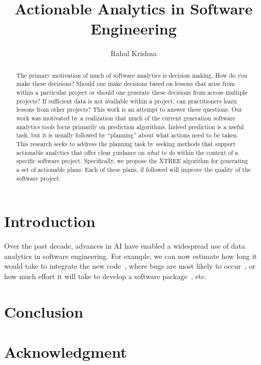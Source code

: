 \documentclass[conference]{IEEEtran}
\begin{document}
\title{Actionable Analytics in Software Engineering\\[-0.2cm]}
\author{Rahul Krishna\\
}

\maketitle


\begin{abstract}

The primary motivation of much of software analytics is decision making. How do you make these decisions? Should one make decisions based on lessons that arise from within a particular project or should one generate these decisions from across multiple projects? If sufficient data is not available within a project, can practitioners learn lessons from other projects? This work is an attempt to answer these questions. Our work was motivated by a realization that much of the current generation software analytics tools focus primarily on prediction algorithms. Indeed prediction is a useful task, but it is usually followed by ``planning'' about what actions need to be taken. This research seeks to address the planning task by seeking methods that support actionable analytics that offer clear guidance on \textit{what to do} within the context of a specific software project. Specifically, we propose the XTREE algorithm for generating a set of actionable plans. Each of these plans, if followed will improve the quality of the software project.

\end{abstract}

\begin{IEEEkeywords}

\end{IEEEkeywords}


\section{Introduction}

Over the past decade, advances in AI have enabled a widespread use of data analytics in software engineering. For example, we can now estimate	how long it would take to integrate the new code~\cite{czer11},	where bugs are most likely to occur~\cite{ostrand04,Menzies2007a}, or how much effort it will take to develop a software package~\cite{turhan11,koc11b}, etc.

\section{Conclusion}

\section*{Acknowledgment}



\end{document}
